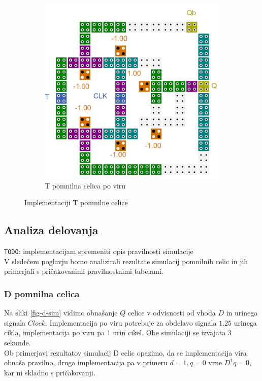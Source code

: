 \documentclass[a4paper, 11pt]{article}
\newcommand{\todo}{\textcolor{BrickRed}{\texttt{TODO}}} %
\begin{document}
\begin{figure}[h!]
\begin{subfigure}[b]{0.4\textwidth}
	\includegraphics[width=\textwidth]{../img/vir_5/t.png} 
	\caption{T pomnilna celica po viru \cite{a_novel_approach}}
	\label{fig-t-2}
	\end{subfigure}
	\caption{Implementaciji T pomnilne celice}
	\label{fig-t}
\end{figure}


\subsection{Analiza delovanja}
\todo: implementacijam spremeniti opis pravilnosti simulacije\\
V sledečem poglavju bomo analizirali rezultate simulacij pomnilnih celic in jih primerjali s pričakovanimi pravilnostnimi tabelami.\\

\subsubsection{D pomnilna celica}
Na sliki \ref{fig-d-sim} vidimo obnašanje $Q$ celice v odvisnosti od vhoda $D$ in urinega signala $Clock$.
Implementacija po viru \cite{quantum_dot} potrebuje za obdelavo signala $1.25$ urinega cikla, implementacija po viru \cite{a_novel_approach} pa $1$ urin cikel. Obe simulaciji se izvajata $3$ sekunde.\\
Ob primerjavi rezultatov simulacij D celic opazimo, da se implementacija vira \cite{quantum_dot} obnaša pravilno, druga implementacija pa v primeru $d=1, q=0$ vrne $D^1q=0$, kar ni skladno s pričakovanji.
\end{document}

